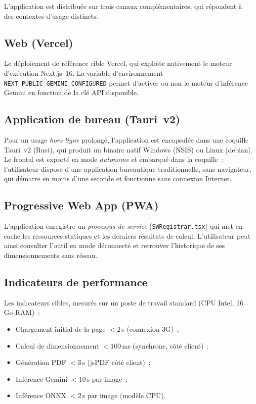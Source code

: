 L'application est distribuée sur trois canaux complémentaires, qui
répondent à des contextes d'usage distincts.

\subsection{Web (Vercel)}
\label{sec:vercel}

Le déploiement de référence cible Vercel, qui exploite nativement le
moteur d'exécution Next.js~16. La variable d'environnement
\texttt{NEXT\_PUBLIC\_GEMINI\_CONFIGURED} permet d'activer ou non le
moteur d'inférence Gemini en fonction de la clé API disponible.

\subsection{Application de bureau (Tauri~v2)}
\label{sec:tauri}

Pour un usage \emph{hors ligne} prolongé, l'application est encapsulée
dans une coquille Tauri~v2 (Rust), qui produit un binaire natif
Windows (NSIS) ou Linux (debian). Le frontal est exporté en mode
\emph{autonome} et embarqué dans la coquille~: l'utilisateur
dispose d'une application bureautique traditionnelle, sans navigateur,
qui démarre en moins d'une seconde et fonctionne sans connexion
Internet.

\subsection{Progressive Web App (PWA)}
\label{sec:pwa}

L'application enregistre un \emph{processus de service}
(\texttt{SWRegistrar.tsx}) qui met en cache les ressources statiques
et les derniers résultats de calcul. L'utilisateur peut ainsi
consulter l'outil en mode déconnecté et retrouver l'historique de
ses dimensionnements sans réseau.

\subsection{Indicateurs de performance}
\label{sec:perfs}

Les indicateurs cibles, mesurés sur un poste de travail standard
(CPU Intel, 16\,Go RAM)~:

\begin{itemize}
  \item Chargement initial de la page $< 2$\,s (connexion 3G)~;
  \item Calcul de dimensionnement $< 100$\,ms (synchrone,
        côté client)~;
  \item Génération PDF $< 3$\,s (jsPDF côté client)~;
  \item Inférence Gemini $< 10$\,s par image~;
  \item Inférence ONNX $< 2$\,s par image (modèle CPU).
\end{itemize}

